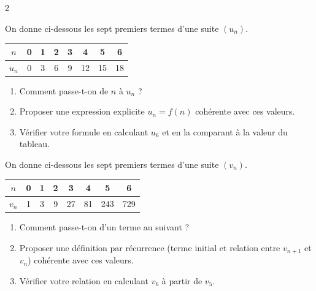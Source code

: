 \documentclass[10pt,a4paper]{article}
\begin{document}
\begin{multicols}{2}
\begin{exo}
On donne ci-dessous les sept premiers termes d'une suite \((u_n)\).

\smallskip

\begin{center}
\begin{tabular}{|c|c|c|c|c|c|c|c|}
    \hline
    \(n\) & 0 & 1 & 2 & 3 & 4 & 5 & 6 \\
    \hline
    \(u_n\) & 0 & 3 & 6 & 9 & 12 & 15 & 18 \\
    \hline
\end{tabular}
\end{center}

\begin{enumerate}[leftmargin=*]
    \item Comment passe-t-on de \(n\) à \(u_n\) ?
    \item Proposer une expression explicite \(u_n = f(n)\) cohérente avec ces valeurs.
    \item Vérifier votre formule en calculant \(u_6\) et en la comparant à la valeur du tableau.
\end{enumerate}
\end{exo}

\begin{exo}
On donne ci-dessous les sept premiers termes d'une suite \((v_n)\).

\smallskip

\begin{center}
\begin{tabular}{|c|c|c|c|c|c|c|c|}
    \hline
    \(n\) & 0 & 1 & 2 & 3 & 4 & 5 & 6 \\
    \hline
    \(v_n\) & 1 & 3 & 9 & 27 & 81 & 243 & 729 \\
    \hline
\end{tabular}
\end{center}

\begin{enumerate}[leftmargin=*]
    \item Comment passe-t-on d'un terme au suivant ?
    \item Proposer une définition par récurrence (terme initial et relation entre \(v_{n+1}\) et \(v_n\)) cohérente avec ces valeurs.
    \item Vérifier votre relation en calculant \(v_6\) à partir de \(v_5\).
\end{enumerate}
\end{exo}


\end{multicols}
\end{document}
